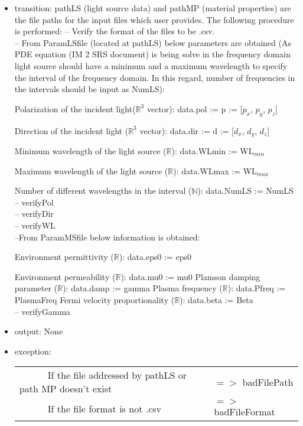 \documentclass[12pt, titlepage]{article}
\begin{document}
\begin{itemize}
	\item transition: pathLS (light source data) and pathMP (material properties) are the file paths for the input files which user provides. The following procedure is performed:
	\subitem -- Verify the format of the files to be .csv.\\
	\subitem -- From ParamLSfile (located at pathLS) below parameters are obtained (As PDE equation (IM 2 SRS document) is being solve in the frequency domain light source should have a minimum and a maximum wavelength to specify the interval of the frequency domain. In this regard, number of frequencies in the intervals should be input as NumLS):
	
	\subsubitem Polarization of the incident light($\mathbb{R}^3$ vector): data.pol := p := [$p_x$, $p_y$, $p_z$]
	 
	\subsubitem Direction of the incident light ($\mathbb{R}^3$ vector): data.dir := d := [$d_x$, $d_y$, $d_z$]
	
	
	\subsubitem Minimum wavelength of the light source ($\mathbb{R}$): data.WLmin := WL$_{min}$ 

	\subsubitem Maximum wavelength of the light source ($\mathbb{R}$): data.WLmax := WL$_{max}$ 
	
	\subsubitem Number of different wavelengths in the interval ($\mathbb{N}$): data.NumLS := NumLS \\
	
	\subitem -- verifyPol\\
	\subitem -- verifyDir\\
	\subitem -- verifyWL\\
	

	\subitem --From ParamMSfile below information is obtained:
	
	\subsubitem Environment permittivity ($\mathbb{R}$): data.eps0 := eps0
	
	\subsubitem Environment permeability ($\mathbb{R}$): data.mu0 := mu0
	\subsubitem Plamson damping parameter ($\mathbb{R}$): data.damp := gamma
	\subsubitem Plasma frequency ($\mathbb{R}$): data.Pfreq := PlasmaFreq
	\subsubitem Fermi velocity proportionality ($\mathbb{R}$): data.beta := Beta\\

	\subitem -- verifyGamma\\
	\item output: None
	
	\item exception: 
	\noindent \begin{longtable*}[l]{l l}
	\ \ \ \ \ \ If the file addressed by pathLS or path MP doesn't exist & $=>$ badFilePath\\
	\ \ \ \ \ \ If the file format is not .csv & $=>$ badFileFormat\\
	\end{longtable*}

\end{itemize}
\end{document}
